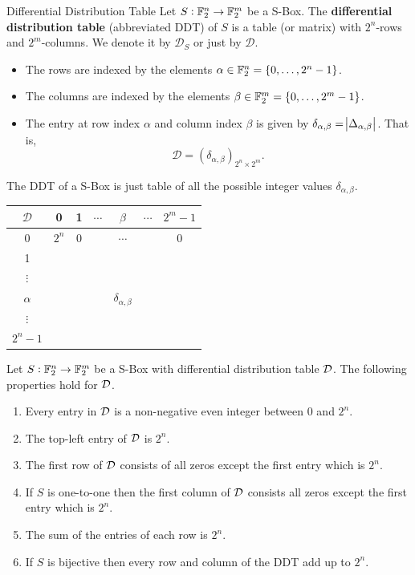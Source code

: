 \documentclass[11pt,openany]{article}
\begin{document}
\begin{defbox}{Differential Distribution Table}
Let $S:\mathbb{F}_2^n\to\mathbb{F}_2^m$ be a S-Box. The \textbf{differential distribution table} (abbreviated DDT) of $S$
is a table (or matrix) with $2^n$-rows and $2^m$-columns. We denote it by $\mathcal{D}_S$ or just by $\mathcal{D}$.
\begin{itemize}
	\item The rows are indexed by the elements $\alpha\in\mathbb{F}_2^n=\set{0,\dots,2^n-1}$.
	\item The columns are indexed by the elements $\beta\in\mathbb{F}_2^m=\set{0,\dots,2^m-1}$.
	\item The entry at row index $\alpha$ and column index $\beta$ is given by $\delta_{\alpha,\beta}=\abs{\Delta_{\alpha,\beta}}$. That is, \[
	\mathcal{D}=(\delta_{\alpha,\beta})_{2^n\times 2^m}.
	\] 
\end{itemize}
\end{defbox}
\begin{remark}
The DDT of a S-Box is just table of all the possible integer values  $\delta_{\alpha,\beta}$.
\begin{table}[h!]\centering
	\renewcommand{\arraystretch}{1.25}
	\begin{tabular}{c||cccccc}
		$\mathcal{D}$ & 0 & 1 & $\cdots$ & $\beta$ & $\cdots$ & $2^{m}-1$\\
		\hline
		\hline
		0 & $2^{n}$ & 0 & &$\cdots$ & & 0 \\
		1 &  \\
		$\vdots$ &  \\
		$\alpha$ &  & & & $\delta_{\alpha,\beta}$& \\
		$\vdots$ & \\
		$2^n-1$ &  \\
	\end{tabular}
\end{table}
\end{remark}
\vspace{12pt}
\begin{probox}{}
\begin{proposition}
Let $S:\mathbb{F}_2^n\to\mathbb{F}_2^m$ be a S-Box with differential distribution table $\mathcal{D}$. The following properties hold for $\mathcal{D}$. \begin{enumerate}[(1)]
	\item Every entry in $\mathcal{D}$ is a non-negative even integer between $0$ and $2^n$.
	\item The top-left entry of $\mathcal{D}$ is $2^n$.
	\item The first row of $\mathcal{D}$ consists of all zeros except the first entry which is $2^n$.
	\item If $S$ is one-to-one then the first column of $\mathcal{D}$ consists all zeros except the first entry which is $2^n$.
	\item The sum of the entries of each row is $2^n$.
	\item If $S$ is bijective then every row and column of the DDT add up to $2^n$.
\end{enumerate}
\end{proposition}
\end{probox}
\end{document}

